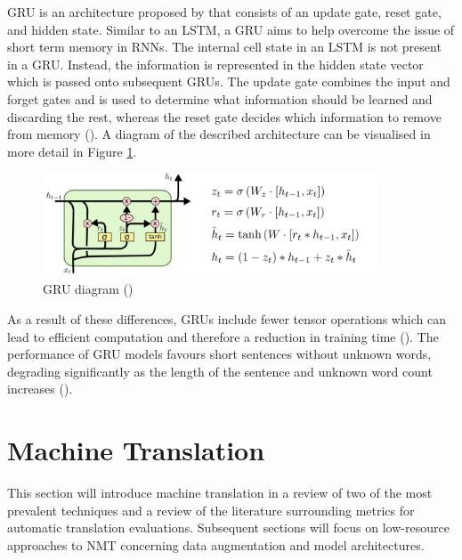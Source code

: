 
\acrfull{GRU} is an architecture proposed by \cite{cho_properties_2014} that consists of an update gate, reset gate, and hidden state. Similar to an \acrshort{LSTM}, a \acrshort{GRU} aims to help overcome the issue of short term memory in \acrshort{RNN}s.
The internal cell state in an \acrshort{LSTM} is not present in a \acrshort{GRU}. Instead, the information is represented in the hidden state vector which is passed onto subsequent \acrshort{GRU}s.
The update gate combines the input and forget gates and is used to determine what information should be learned and discarding the rest, whereas the reset gate decides which information to remove from memory (\cite{gao_gru_2016}).
A diagram of the described architecture can be visualised in more detail in Figure \ref{fig:rnn_gru}.
\begin{figure}[ht!]
\centering
\includegraphics[width=0.89\textwidth]{media/literature/machine_learning/ml_rnn_gru.png}
\caption[Gated Recurrent Unit]{\acrfull{GRU} diagram (\cite{colah_lstm_2019})}
\label{fig:rnn_gru}
\end{figure}

As a result of these differences, \acrshort{GRU}s include fewer tensor operations which can lead to efficient computation and therefore a reduction in training time (\cite{chung_gru_2014}).
The performance of \acrshort{GRU} models favours short sentences without unknown words, degrading significantly as the length of the sentence and unknown word count increases (\cite{cho_properties_2014}).

\section{Machine Translation}
\label{Machine Translation}

This section will introduce machine translation in a review of two of the most prevalent techniques and a review of the literature surrounding metrics for automatic translation evaluations. Subsequent sections will focus on low-resource approaches to \acrshort{NMT} concerning data augmentation and model architectures.

